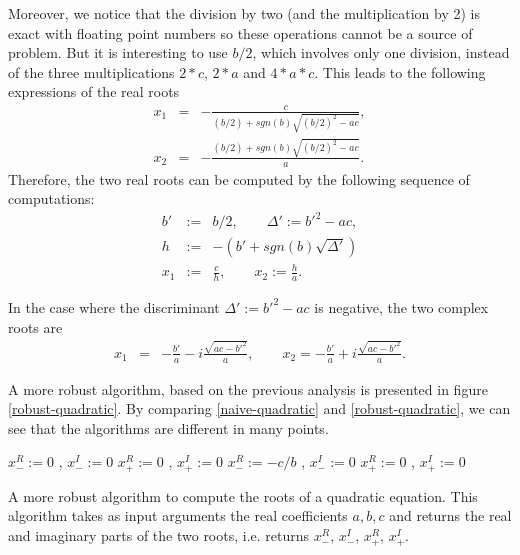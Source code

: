 Moreover, we notice that the division by two (and the multiplication
by 2) is exact with floating point numbers so these operations
cannot be a source of problem. But it is 
interesting to use $b/2$, which involves only one division, instead
of the three multiplications $2*c$, $2*a$ and $4*a*c$.
This leads to the following expressions of the real roots 
\begin{eqnarray}
x_1 &=& -\frac{c}{(b/2)+sgn(b)\sqrt{(b/2)^2-ac}}, \\
x_2 &=& -\frac{(b/2)+sgn(b)\sqrt{(b/2)^2-ac}}{a}.
\end{eqnarray}
Therefore, the two real roots can be computed by the following sequence of 
computations:
\begin{eqnarray}
b'&:=&b/2, \qquad \Delta' := b'^2-ac,\\
h&:=& -\left(b'+sgn(b)\sqrt{\Delta'}\right)\\
x_1 &:=& \frac{c}{h}, \qquad x_2 := \frac{h}{a}. 
\end{eqnarray}

In the case where the discriminant $\Delta' := b'^2-ac$ is negative, the 
two complex roots are
\begin{eqnarray}
x_1 &=& -\frac{b'}{a} - i \frac{\sqrt{ac-b'^2}}{a}, \qquad 
x_2 = -\frac{b'}{a} + i \frac{\sqrt{ac-b'^2}}{a}. 
\end{eqnarray}

A more robust algorithm, based on the previous analysis is presented in figure \ref{robust-quadratic}.
By comparing \ref{naive-quadratic} and \ref{robust-quadratic}, we can see that 
the algorithms are different in many points.

\begin{algorithm}[htbp]
 {
         {
             $x_-^R:= 0$ , $x_-^I:= 0$ \;
             $x_+^R:= 0$ , $x_+^I:= 0$ \;
        } {
             $x_-^R:= -c/b$ , $x_-^I:= 0$ \;
             $x_+^R:= 0$ , $x_+^I:= 0$ \;
        }
}
\caption{A more robust algorithm to compute the roots of a quadratic equation. This algorithm 
takes as input arguments the real coefficients $a,b,c$ and returns the real and imaginary parts 
of the two roots, i.e. returns $x_-^R$, $x_-^I$, $x_+^R$, $x_+^I$.}
\label{robust-quadratic}
\end{algorithm}


